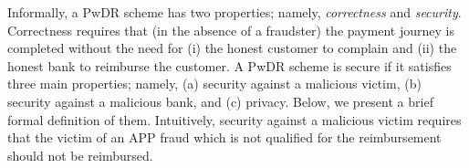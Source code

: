 

Informally, a PwDR scheme has two  properties; namely, \emph{correctness} and \emph{security}. Correctness requires that (in the absence of a fraudster) the payment journey is completed without the need for (i) the honest customer to complain and (ii)  the honest bank to reimburse the customer.  A PwDR scheme is  secure if it satisfies three main properties; namely, (a) security against a malicious victim, (b) security against a malicious bank, and (c) privacy. Below, we present a brief formal definition of   them. Intuitively, security against a malicious victim requires that the victim of an APP fraud which is not qualified for the reimbursement should not be reimbursed. 
%
